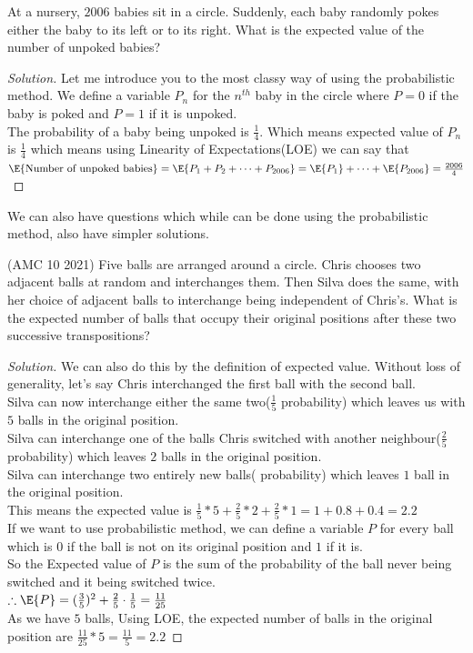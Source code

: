 \begin{example}
[HMMT 2006] At a nursery, $2006$ babies sit in a circle. Suddenly, each baby randomly pokes either the baby to its left or to its right. What is the expected value of the number of unpoked babies?
\end{example}
\begin{proof}
    [Solution]
Let me introduce you to the most classy way of using the probabilistic method. We define a variable $P_n$ for the $n^{th}$ baby in the circle where $P=0$ if the baby is poked and $P=1$ if it is unpoked.\\
The probability of a baby being unpoked is $\frac{1}{4}$. Which means expected value of $P_n$ is $\frac{1}{4}$ which means using Linearity of Expectations(LOE) we can say that $\E{\text{Number of unpoked babies}}=\E{P_1+P_2+\dots+P_{2006}}=\E{P_1}+\dots+\E{P_{2006}}=\frac{2006}{4}$\\
\end{proof}
We can also have questions which while can be done using the probabilistic method, also have simpler solutions.
\begin{example}
(AMC 10 2021) Five balls are arranged around a circle. Chris chooses two adjacent balls at random and interchanges them. Then Silva does the same, with her choice of adjacent balls to interchange being independent of Chris’s. What is the expected number of balls that occupy their original positions after these two successive transpositions?
\end{example}
\begin{proof}
    [Solution]
We can also do this by the definition of expected value. Without loss of generality, let's say Chris interchanged the first ball with the second ball.\\
Silva can now interchange either the same two($\frac{1}{5}$ probability) which leaves us with $5$ balls in the original position.\\
Silva can interchange one of the balls Chris switched with another neighbour($\frac{2}{5}$ probability) which leaves $2$ balls in the original position.\\
Silva can interchange two entirely new balls( probability) which leaves $1$ ball in the original position.\\
This means the expected value is $\frac{1}{5}*5+\frac{2}{5}*2+\frac{2}{5}*1=1+0.8+0.4=2.2$\\
If we want to use probabilistic method, we can define a variable $P$ for every ball which is $0$ if the ball is not on its original position and $1$ if it is.\\
So the Expected value of $P$ is the sum of the probability of the ball never being switched and it being switched twice.\\
$\therefore \E{P}=(\frac{3}{5})^2+\frac{2}{5}\cdot\frac{1}{5}=\frac{11}{25}$\\
As we have $5$ balls, Using LOE, the expected number of balls in the original position are $\frac{11}{25}*5=\frac{11}{5}=2.2$
\end{proof}
